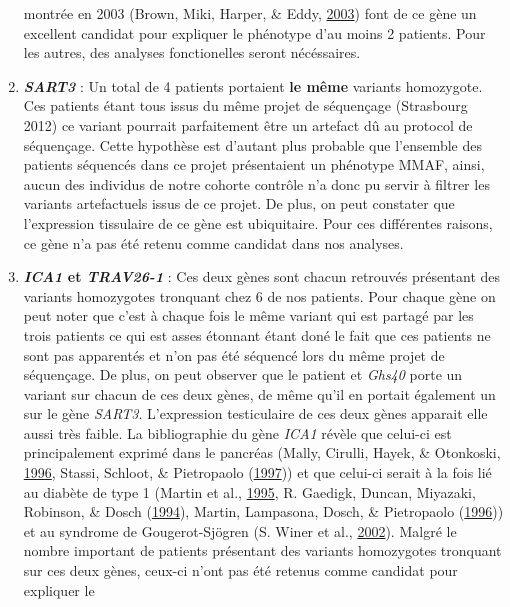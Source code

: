 \documentclass[12pt,twoside]{reedthesis}
\theoremstyle{definition}
\theoremstyle{definition}
\theoremstyle{remark}
\begin{document}
\begin{enumerate}
    montrée en 2003 (Brown, Miki, Harper, \& Eddy,
    \protect\hyperlink{ref-Brown2003}{2003}) font de ce gène un excellent
    candidat pour expliquer le phénotype d'au moins 2 patients. Pour les
    autres, des analyses fonctionelles seront nécéssaires.
  \item
    \textbf{\emph{SART3}} : Un total de 4 patients portaient \textbf{le
    même} variants homozygote. Ces patients étant tous issus du même
    projet de séquençage (Strasbourg 2012) ce variant pourrait
    parfaitement être un artefact dû au protocol de séquençage. Cette
    hypothèse est d'autant plus probable que l'ensemble des patients
    séquencés dans ce projet présentaient un phénotype MMAF, ainsi, aucun
    des individus de notre cohorte contrôle n'a donc pu servir à filtrer
    les variants artefactuels issus de ce projet. De plus, on peut
    constater que l'expression tissulaire de ce gène est ubiquitaire. Pour
    ces différentes raisons, ce gène n'a pas été retenu comme candidat
    dans nos analyses.
  \item
    \textbf{\emph{ICA1} et \emph{TRAV26-1}} : Ces deux gènes sont chacun
    retrouvés présentant des variants homozygotes tronquant chez 6 de nos
    patients. Pour chaque gène on peut noter que c'est à chaque fois le
    même variant qui est partagé par les trois patients ce qui est asses
    étonnant étant doné le fait que ces patients ne sont pas apparentés et
    n'on pas été séquencé lors du même projet de séquençage. De plus, on
    peut observer que le patient et \emph{Ghs40} porte un variant sur
    chacun de ces deux gènes, de même qu'il en portait également un sur le
    gène \emph{SART3}. L'expression testiculaire de ces deux gènes
    apparait elle aussi très faible. La bibliographie du gène \emph{ICA1}
    révèle que celui-ci est principalement exprimé dans le pancréas
    (Mally, Cirulli, Hayek, \& Otonkoski,
    \protect\hyperlink{ref-Mally1996}{1996}, Stassi, Schloot, \&
    Pietropaolo (\protect\hyperlink{ref-Stassi1997}{1997})) et que
    celui-ci serait à la fois lié au diabète de type 1 (Martin et al.,
    \protect\hyperlink{ref-Martin1995}{1995}, R. Gaedigk, Duncan,
    Miyazaki, Robinson, \& Dosch
    (\protect\hyperlink{ref-Gaedigk1994}{1994}), Martin, Lampasona, Dosch,
    \& Pietropaolo (\protect\hyperlink{ref-Martin1996}{1996})) et au
    syndrome de Gougerot-Sjögren (S. Winer et al.,
    \protect\hyperlink{ref-Winer2002}{2002}). Malgré le nombre important
    de patients présentant des variants homozygotes tronquant sur ces deux
    gènes, ceux-ci n'ont pas été retenus comme candidat pour expliquer le

\end{enumerate}
\end{document}

